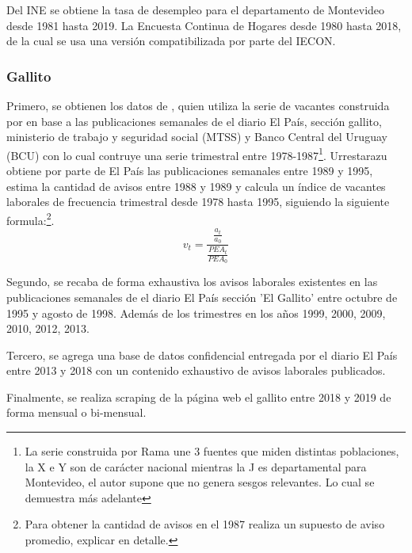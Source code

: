 Del INE se obtiene la tasa de desempleo para el departamento de Montevideo desde 1981 hasta 2019.
La Encuesta Continua de Hogares desde 1980 hasta 2018, de la cual se usa una versión compatibilizada por parte del IECON.

\subsubsection*{Gallito}
Primero, se obtienen los datos de \cite{Urrestarazu1997}, quien utiliza la serie de vacantes construida por \cite{Rama1988} en base a las publicaciones semanales de el diario El País, sección gallito, ministerio de trabajo y seguridad social (MTSS) y Banco Central del Uruguay (BCU) con lo cual contruye una serie trimestral entre 1978-1987\footnote{La serie construida por Rama une 3 fuentes que miden distintas poblaciones, la  X e Y son de carácter nacional mientras la J es departamental para Montevideo, el autor supone que no genera sesgos relevantes. Lo cual se demuestra más adelante}. Urrestarazu obtiene por parte de El País las publicaciones semanales entre 1989 y 1995, estima la cantidad de avisos entre 1988 y 1989 y calcula un índice de vacantes laborales de frecuencia trimestral desde 1978 hasta 1995, siguiendo la siguiente formula:\footnote{Para obtener la cantidad de avisos en el 1987 realiza un supuesto de aviso promedio, explicar en detalle.}.
\begin{equation}
v_t = \frac{\frac{a_t}{a_0}}{\frac{PEA_t}{PEA_0}}
\end{equation}

Segundo, se recaba de forma exhaustiva los avisos laborales existentes en las publicaciones semanales de el diario El País sección 'El Gallito' entre octubre de 1995 y agosto de 1998. Además de los trimestres en los años 1999, 2000, 2009, 2010, 2012, 2013.

Tercero, se agrega una base de datos confidencial entregada por el diario El País entre 2013 y 2018 con un contenido exhaustivo de avisos laborales publicados.

Finalmente, se realiza scraping de la página web el gallito entre 2018 y 2019 de forma mensual o bi-mensual.

